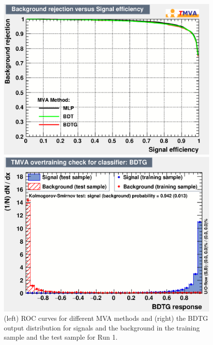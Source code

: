 
\begin{figure}[!tbp]
\begin{minipage}[t]{0.48\textwidth}
\centering
\includegraphics[width=1.0\textwidth]{Figures/03_Zcs/04_Selection/rejBvsS_run1}
\end{minipage}
\begin{minipage}[t]{0.48\textwidth}
\centering
\includegraphics[width=1.0\textwidth]{Figures/03_Zcs/04_Selection/overtrain_BDTG_run1}
\end{minipage}
\caption{ 
 (left) ROC curves for different MVA methods and (right) the BDTG output distribution for signals and the background in the training sample and the test sample for Run 1.} 
\label{fig:MVAMonitor_run1}
\end{figure}

